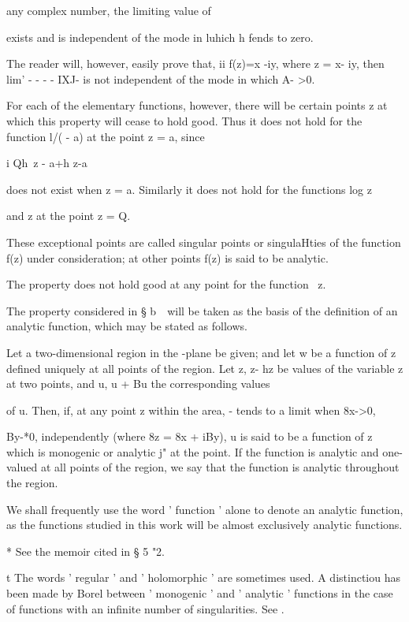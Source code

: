 %
%
any complex
number, the limiting value of

exists and is independent of the mode in luhich h fends to zero.

The reader will, however, easily prove that, ii f(z)=x -iy, where z =
x- iy, then lim' - - - - IXJ- is not independent of the mode in which
A- >0.


For each of the elementary functions, however, there will be certain
points z at which this property will cease to hold good. Thus it does
not hold for the function l/( - a) at the point z = a, since

 i Qh\ z - a+h z-a

does not exist when z = a. Similarly it does not hold for the
functions log z

and z at the point z = Q.

These exceptional points are called singular points or singulaHties of
the function f(z) under consideration; at other points f(z) is said
to be analytic.

The property does not hold good at any point for the function \ z.


The property considered in § b\ \ will be taken as the basis of the
definition of an analytic function, which may be stated as follows.

Let a two-dimensional region in the -plane be given; and let w be a
function of z defined uniquely at all points of the region. Let z, z-
hz be values of the variable z at two points, and u, u + Bu the
corresponding values

of u. Then, if, at any point z within the area, - tends to a limit
when 8x->0,

By-*0, independently (where 8z = 8x + iBy), u is said to be a function
of z which is monogenic or analytic j" at the point. If the function
is analytic and one-valued at all points of the region, we say that
the function is analytic throughout the region.

We shall frequently use the word ' function ' alone to denote an
analytic function, as the functions studied in this work will be
almost exclusively analytic functions.

* See the memoir cited in § 5 "2.

t The words ' regular ' and ' holomorphic ' are sometimes used. A
distinctiou has been made by Borel between ' monogenic ' and '
analytic ' functions in the case of functions with an infinite number
of singularities. See .

